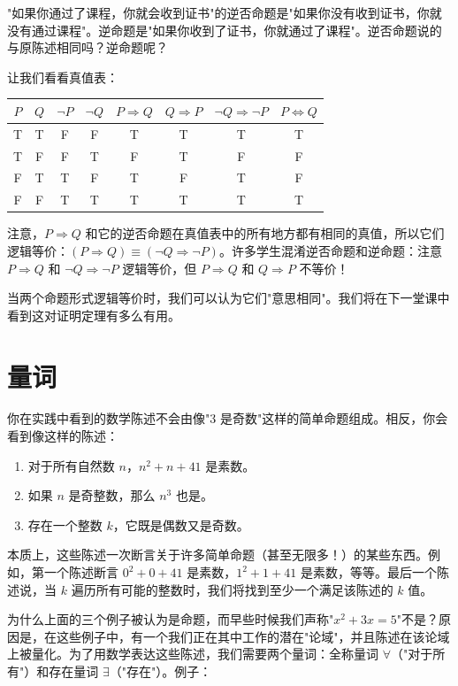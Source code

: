 \documentclass[11pt]{article}
\begin{document}
"如果你通过了课程，你就会收到证书"的逆否命题是"如果你没有收到证书，你就没有通过课程"。逆命题是"如果你收到了证书，你就通过了课程"。逆否命题说的与原陈述相同吗？逆命题呢？

让我们看看真值表：

\begin{center}
\begin{tabular}{cc|c|c|c|c|c|c}
$P$ & $Q$ & $\neg P$ & $\neg Q$ & $P \Rightarrow Q$ & $Q \Rightarrow P$ & $\neg Q \Rightarrow \neg P$ & $P \Leftrightarrow Q$ \\
\hline
T & T & F & F & T & T & T & T \\
T & F & F & T & F & T & F & F \\
F & T & T & F & T & F & T & F \\
F & F & T & T & T & T & T & T
\end{tabular}
\end{center}

注意，$P \Rightarrow Q$ 和它的逆否命题在真值表中的所有地方都有相同的真值，所以它们逻辑等价：$(P \Rightarrow Q) \equiv (\neg Q \Rightarrow \neg P)$。许多学生混淆逆否命题和逆命题：注意 $P \Rightarrow Q$ 和 $\neg Q \Rightarrow \neg P$ 逻辑等价，但 $P \Rightarrow Q$ 和 $Q \Rightarrow P$ 不等价！

当两个命题形式逻辑等价时，我们可以认为它们"意思相同"。我们将在下一堂课中看到这对证明定理有多么有用。

\section{量词}

你在实践中看到的数学陈述不会由像"3 是奇数"这样的简单命题组成。相反，你会看到像这样的陈述：
\begin{enumerate}
\item 对于所有自然数 $n$，$n^2 + n + 41$ 是素数。
\item 如果 $n$ 是奇整数，那么 $n^3$ 也是。
\item 存在一个整数 $k$，它既是偶数又是奇数。
\end{enumerate}

本质上，这些陈述一次断言关于许多简单命题（甚至无限多！）的某些东西。例如，第一个陈述断言 $0^2 + 0 + 41$ 是素数，$1^2 + 1 + 41$ 是素数，等等。最后一个陈述说，当 $k$ 遍历所有可能的整数时，我们将找到至少一个满足该陈述的 $k$ 值。

为什么上面的三个例子被认为是命题，而早些时候我们声称"$x^2 + 3x = 5$"不是？原因是，在这些例子中，有一个我们正在其中工作的潜在"论域"，并且陈述在该论域上被量化。为了用数学表达这些陈述，我们需要两个量词：全称量词 $\forall$（"对于所有"）和存在量词 $\exists$（"存在"）。例子：
\end{document}
